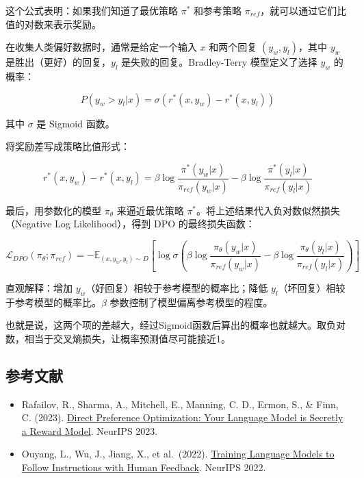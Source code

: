 这个公式表明：如果我们知道了最优策略 \(\pi^*\) 和参考策略 \(\pi_{ref}\)，就可以通过它们比值的对数来表示奖励。

在收集人类偏好数据时，通常是给定一个输入 \(x\) 和两个回复 \((y_w,y_l)\)，其中 \(y_w\) 是胜出（更好）的回复，\(y_l\) 是失败的回复。Bradley-Terry 模型定义了选择 \(y_w\) 的概率：

\[
P(y_w>y_l|x)=\sigma(r^*(x,y_w)-r^*(x,y_l))
\]

其中 \(\sigma\) 是 Sigmoid 函数。

将奖励差写成策略比值形式：

\[
r^*(x,y_w)-r^*(x,y_l)=\beta\log\frac{\pi^*(y_w|x)}{\pi_{ref}(y_w|x)}-\beta\log\frac{\pi^*(y_l|x)}{\pi_{ref}(y_l|x)}
\]

最后，用参数化的模型 \(\pi_\theta\) 来逼近最优策略 \(\pi^*\)。将上述结果代入负对数似然损失（Negative Log Likelihood），得到 DPO 的最终损失函数：

\[
\mathcal{L}_{DPO}(\pi_\theta;\pi_{ref})=-\mathbb{E}_{(x,y_w,y_l)\sim D}\left[\log\sigma\left(\beta\log\frac{\pi_\theta(y_w|x)}{\pi_{ref}(y_w|x)}-\beta\log\frac{\pi_\theta(y_l|x)}{\pi_{ref}(y_l|x)}\right)\right]
\]

直观解释：增加 \(y_w\)（好回复）相较于参考模型的概率比；降低 \(y_l\)（坏回复）相较于参考模型的概率比。\(\beta\) 参数控制了模型偏离参考模型的程度。

也就是说，这两个项的差越大，经过Sigmoid函数后算出的概率也就越大。取负对数，相当于交叉熵损失，让概率预测值尽可能接近1。

\FloatBarrier
{}
\hypertarget{ux53c2ux8003ux6587ux732e-80}{%
\subsection{参考文献}\label{ux53c2ux8003ux6587ux732e-80}}

\vspace{0.25em}
\begin{itemize}
\tightlist
\item
  Rafailov, R., Sharma, A., Mitchell, E., Manning, C. D., Ermon, S., \& Finn, C. (2023). \href{https://arxiv.org/abs/2305.18290}{Direct Preference Optimization: Your Language Model is Secretly a Reward Model}. NeurIPS 2023.
\item
  Ouyang, L., Wu, J., Jiang, X., et al.~(2022). \href{https://arxiv.org/abs/2203.02155}{Training Language Models to Follow Instructions with Human Feedback}. NeurIPS 2022.
\end{itemize}

\clearpage
